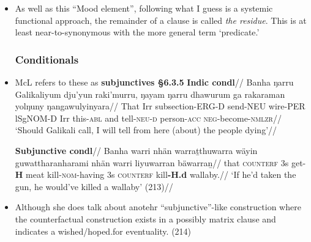 \documentclass[10pt]{article}
\begin{document}
\begin{itemize}
			\item As well as this ``Mood element'', following what I guess is a systemic functional approach, the remainder of a clause is called \textit{the residue}. This is at least near-to-synonymous with the more general term `predicate.'
			
		\subsubsection{Conditionals}
		\item McL refers to these as \textbf{subjunctives §6.3.5}
			\pex\a\begingl\glpreamble\textbf{Indic condl}//
			\gla Banha ŋarru Galikaliyum dju'yun raki'murru, ŋayam ŋarru dhawurum ga rakaraman yolŋuny ŋangawulyinyara//
		\glb That Irr subsection-ERG-D send-NEU wire-PER lSgNOM-D Irr this\textsc{-abl} and tell\textsc{-neu-d} person\textsc{-acc} \textsc{neg}-become\textsc{-nmlzr}//
		\glft`Should Galikali call, I will tell from here (about) the people dying'//\endgl
		
		\a\begingl\glpreamble\textbf{Subjunctive condl}//
		\gla Banha warri nhän warraṯthuwarra wäyin guwattharanharami nhän warri liyuwarran bäwarraṉ//
		\glb that \textsc{counterf} 3s get-\textbf{H} meat kill\textsc{-nom}-having 3s \textsc{counterf} kill\textbf{-H.d} wallaby.//
		\glft`If he'd taken the gun, he would've killed a wallaby' (213)//\endgl
		\xe
	\item Although she does talk about anotehr ``subjunctive''-like construction where the counterfactual construction exists in a possibly matrix clause and indicates a wished/hoped.for eventuality. (214)
	


	\end{itemize}
\end{document}
